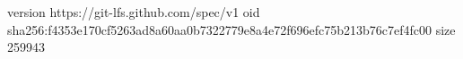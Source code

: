version https://git-lfs.github.com/spec/v1
oid sha256:f4353e170cf5263ad8a60aa0b7322779e8a4e72f696efc75b213b76c7ef4fc00
size 259943
